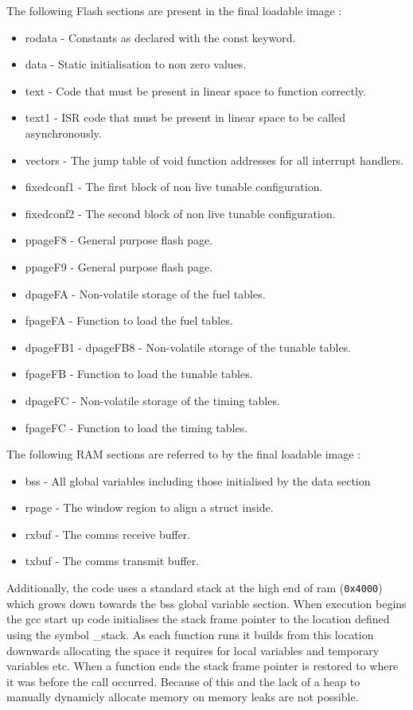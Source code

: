 \documentclass[12pt,a4wide,titlepage]{article}
\begin{document}
\begin{titlepage}
\begin{center}
The following Flash sections are present in the final loadable image :


\begin{itemize}
\item rodata - Constants as declared with the const keyword.
\item data - Static initialisation to non zero values.
\item text - Code that must be present in linear space to function correctly.
\item text1 - ISR code that must be present in linear space to be called asynchronously.
\item vectors - The jump table of void function addresses for all interrupt handlers.
\item fixedconf1 - The first block of non live tunable configuration.
\item fixedconf2 - The second block of non live tunable configuration.
\item ppageF8 - General purpose flash page.
\item ppageF9 - General purpose flash page.
\item dpageFA - Non-volatile storage of the fuel tables.
\item fpageFA - Function to load the fuel tables.
\item dpageFB1 - dpageFB8 - Non-volatile storage of the tunable tables.
\item fpageFB - Function to load the tunable tables.
\item dpageFC - Non-volatile storage of the timing tables.
\item fpageFC - Function to load the timing tables.
\end{itemize}

The following RAM sections are referred to by the final loadable image :

\begin{itemize}
\item bss - All global variables including those initialised by the data section
\item rpage - The window region to align a struct inside.
\item rxbuf - The comms receive buffer.
\item txbuf - The comms transmit buffer.
\end{itemize}


Additionally, the code uses a standard stack at the high end of ram (\texttt{0x4000}) which grows down towards the bss global variable section. When execution begins the gcc start up code initialises the stack frame pointer to the location defined using the symbol \_stack. As each function runs it builds from this location downwards allocating the space it requires for local variables and temporary variables etc. When a function ends the stack frame pointer is restored to where it was before the call occurred. Because of this and the lack of a heap to manually dynamicly allocate memory on memory leaks are not possible.





\end{center}
\end{titlepage}
\end{document}

